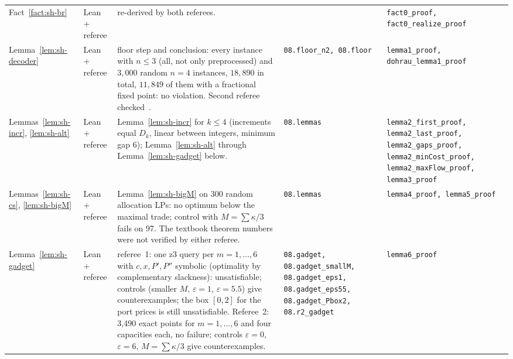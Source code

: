 \begin{longtable}{@{}p{2.7cm}p{1.1cm}p{4.2cm}p{3.75cm}p{3.05cm}@{}}
Fact~\ref{fact:sh-br} & Lean + referee & re-derived by both referees. & & {\scriptsize\raggedright\texttt{fact0\_proof,\allowbreak{} fact0\_realize\_proof}}\\
Lemma~\ref{lem:sh-decoder} & Lean + referee & floor step and conclusion: every instance with $n\le3$ (all, not only preprocessed) and $3{,}000$ random $n=4$ instances, $18{,}890$ in total, $11{,}849$ of them with a fractional fixed point: no violation. Second referee checked~\cite[Def.~2, Lemma~1]{dgkmw17}. & {\scriptsize\raggedright\texttt{08.floor\_n2,\allowbreak{} 08.floor}\par} & {\scriptsize\raggedright\texttt{lemma1\_proof,\allowbreak{} dohrau\_lemma1\_proof}}\\
Lemmas~\ref{lem:sh-incr}, \ref{lem:sh-alt} & Lean + referee & Lemma~\ref{lem:sh-incr} for $k\le4$ (increments equal $D_k$, linear between integers, minimum gap $6$); Lemma~\ref{lem:sh-alt} through Lemma~\ref{lem:sh-gadget} below. & {\scriptsize\raggedright\texttt{08.lemmas}\par} & {\scriptsize\raggedright\texttt{lemma2\_first\_proof,\allowbreak{} lemma2\_last\_proof,\allowbreak{} lemma2\_gaps\_proof,\allowbreak{} lemma2\_minCost\_proof,\allowbreak{} lemma2\_maxFlow\_proof,\allowbreak{} lemma3\_proof}}\\
Lemmas~\ref{lem:sh-cs}, \ref{lem:sh-bigM} & Lean + referee & Lemma~\ref{lem:sh-bigM} on 300 random allocation LPs: no optimum below the maximal trade; control with $M=\sum\kappa/3$ fails on 97. The textbook theorem numbers were not verified by either referee. & {\scriptsize\raggedright\texttt{08.lemmas}\par} & {\scriptsize\raggedright\texttt{lemma4\_proof,\allowbreak{} lemma5\_proof}}\\
Lemma~\ref{lem:sh-gadget} & Lean + referee & referee~1: one z3 query per $m=1,\dots,6$ with $c,x,P',P''$ symbolic (optimality by complementary slackness): unsatisfiable; controls (smaller $M$, $\varepsilon=1$, $\varepsilon=5.5$) give counterexamples; the box $[0,2]$ for the port prices is still unsatisfiable. Referee~2: 3{,}490 exact points for $m=1,\dots,6$ and four capacities each, no failure; controls $\varepsilon=0$, $\varepsilon=6$, $M=\sum\kappa/3$ give counterexamples. & {\scriptsize\raggedright\texttt{08.gadget,\allowbreak{} 08.gadget\_smallM,\allowbreak{} 08.gadget\_eps1,\allowbreak{} 08.gadget\_eps55,\allowbreak{} 08.gadget\_Pbox2,\allowbreak{} 08.r2\_gadget}\par} & {\scriptsize\raggedright\texttt{lemma6\_proof}}\\

\end{longtable}
